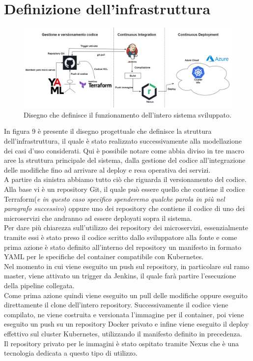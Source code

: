\documentclass[a4paper,12pt]{report}
\begin{document}
\section{Definizione dell'infrastruttura}
\begin{figure}[h]
	\includegraphics[width=1.0\textwidth]{disegno_struttura_infra}
    \caption{Disegno che definisce il funzionamento dell'intero sistema sviluppato.}
    \label{fig:disegno_struttura_infra}
\end{figure}
In figura 9 è presente il disegno progettuale che definisce la struttura dell'infrastruttura, il quale è stato realizzato successivamente alla modellazione dei casi d'uso considerati. Qui è possibile notare come abbia diviso in tre macro aree la struttura principale del sistema, dalla gestione del codice all'integrazione delle modifiche fino ad arrivare al deploy e resa operativa dei servizi.\\
A partire da sinistra abbiamo tutto ciò che riguarda il versionamento del codice. Alla base vi è un repository Git, il quale può essere quello che contiene il codice Terraform(\textit{e in questo caso specifico spenderemo qualche parola in più nel paragrafo successivo}) oppure uno dei repository che contiene il codice di uno dei microservizi che andranno ad essere deployati sopra il sistema.\\
Per dare più chiarezza sull'utilizzo dei repository dei microservizi, essenzialmente tramite essi è stato preso il codice scritto dallo sviluppatore alla fonte e come prima azione è stato definito all'interno del repository un manifesto in formato YAML per le specifiche del container compatibile con Kubernetes.\\
Nel momento in cui viene eseguito un push sul repository, in particolare sul ramo master, viene attivato un trigger da Jenkins, il quale farà partire l'esecuzione della pipeline collegata.\\
Come prima azione quindi viene eseguito un pull delle modifiche oppure eseguito direttamente il clone dell'intero repository. Successivamente il codice viene compilato, ne viene costruita e versionata l'immagine per il container, poi viene eseguito un push su un repository Docker privato e infine viene eseguito il deploy effettivo sul cluster Kubernetes, utilizzando il manifesto definito in precedenza.\\
Il repository privato per le immagini è stato ospitato tramite Nexus che è una tecnologia dedicata a questo tipo di utilizzo.
\end{document}
